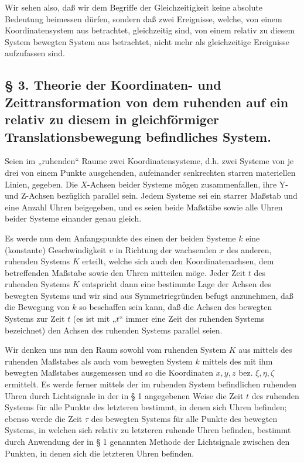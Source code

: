 \documentclass[17pt]{webarticle}       %
\begin{document}
Wir sehen also, daß wir dem Begriffe der Gleichzeitigkeit keine absolute Bedeutung beimessen dürfen, sondern daß zwei Ereignisse, welche, von einem Koordinatensystem aus betrachtet, gleichzeitig sind, von einem relativ zu diesem System bewegten System aus betrachtet, nicht mehr als gleichzeitige Ereignisse aufzufassen sind.

\subsection*{§ 3. Theorie der Koordinaten- und Zeittransformation von dem ruhenden auf ein relativ zu diesem in gleichförmiger Translationsbewegung befindliches System.}

Seien im „ruhenden“ Raume zwei Koordinatensysteme, d.h. zwei Systeme von je drei von einem Punkte ausgehenden, aufeinander senkrechten starren materiellen Linien, gegeben. Die $X$-Achsen beider Systeme mögen zusammenfallen, ihre Y- und Z-Achsen bezüglich parallel sein. Jedem Systeme sei ein starrer Maßstab und eine Anzahl Uhren beigegeben, und es seien beide Maßstäbe sowie alle Uhren beider Systeme einander genau gleich.

Es werde nun dem Anfangspunkte des einen der beiden Systeme \( k \) eine (konstante) Geschwindigkeit \( v \) in Richtung der wachsenden \( x \) des anderen, ruhenden Systems \( K \) erteilt, welche sich auch den Koordinatenachsen, dem betreffenden Maßstabe sowie den Uhren mitteilen möge. Jeder Zeit \( t \) des ruhenden Systems \( K \) entspricht dann eine bestimmte Lage der Achsen des bewegten Systems und wir sind aus Symmetriegründen befugt anzunehmen, daß die Bewegung von \( k \) so beschaffen sein kann, daß die Achsen des bewegten Systems zur Zeit \( t \) (es ist mit „\( t \)“ immer eine Zeit des ruhenden Systems bezeichnet) den Achsen des ruhenden Systems parallel seien.

Wir denken uns nun den Raum sowohl vom ruhenden System \( K \) aus mittels des ruhenden Maßstabes als auch vom bewegten System \( k \) mittels des mit ihm bewegten Maßstabes ausgemessen und so die Koordinaten \( x, y, z \) bez. \( \xi, \eta, \zeta \) ermittelt. Es werde ferner mittels der im ruhenden System befindlichen ruhenden Uhren durch Lichtsignale in der in § 1 angegebenen Weise die Zeit \( t \) des ruhenden Systems für alle Punkte des letzteren bestimmt, in denen sich Uhren befinden; ebenso werde die Zeit \( \tau \) des bewegten Systems für alle Punkte des bewegten Systems, in welchen sich relativ zu letzteren ruhende Uhren befinden, bestimmt durch Anwendung der in § 1 genannten Methode der Lichtsignale zwischen den Punkten, in denen sich die letzteren Uhren befinden.
\end{document}
